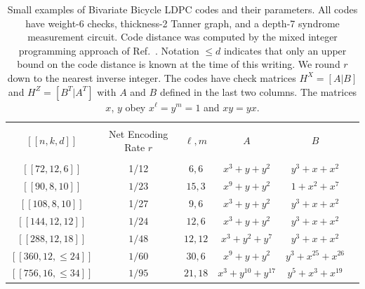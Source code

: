\documentclass{article}
\begin{document}
\begin{table}[t]
\begin{center}
\begin{tabular}{c|c|c|c|c|c}
\hline
& & & & &   \\
$[[n,k,d]]$ & \parbox{3cm}{\centering Net Encoding \\ Rate $r$}   & 
$\ell,m$ & $A$ & $B$ \\
& & & & &   \\
\hline
\hline
$[[72,12,6]]$ &  1/12 &   $6,6$ & $x^3+y+y^2$  & $y^3+x+x^2$ \\
\hline 
$[[90,8,10]]$ & $1/23$  & $15,3$ & $x^9 + y + y^2$ & $1+ x^2 +x^7$ \\ 
\hline
$[[108,8,10]]$ &  1/27 &    $9,6$ &  $x^3+y+y^2$ & $y^3+x+x^2$  \\
\hline 
$[[144,12,12]]$ & $1/24$ &   $12,6$ &  $x^3+y+y^2$ & $y^3+x+x^2$ \\
\hline
$[[288,12,18]]$ & $1/48$ &   $12,12$ & $x^3 + y^2 + y^7$  & $y^3 + x+x^2$\\
\hline
$[[360,12,\le 24]]$ & $1/60$ &  $30,6$ &  $x^9 + y + y^2$  &  $y^3 + x^{25}+x^{26}$\\
\hline
$[[756,16,\le 34]]$ & $1/95$  & $21,18$ &
$x^{3}+y^{10} + y^{17}$ & $y^5+x^3+x^{19}$\\
\end{tabular}
\end{center}
\caption{Small examples of Bivariate Bicycle LDPC codes and their parameters.  All codes have weight-6 checks, thickness-2 Tanner graph, and a depth-7 syndrome measurement circuit. 
Code distance was computed by the mixed integer programming approach of
Ref.~\cite{landahl2011fault}.
 Notation $\le d$ indicates that only an upper bound on the code distance is known at the time of this writing.  We round $r$ down to the nearest inverse integer. 
The codes have check matrices  $H^X=[A|B]$
and $H^Z=[B^T|A^T]$ with  $A$ and $B$ defined in the last two columns.
The matrices $x$, $y$ obey
$x^\ell=y^m=1$ and $xy=yx$.}
\label{table:codes}
\end{table}
\end{document}
